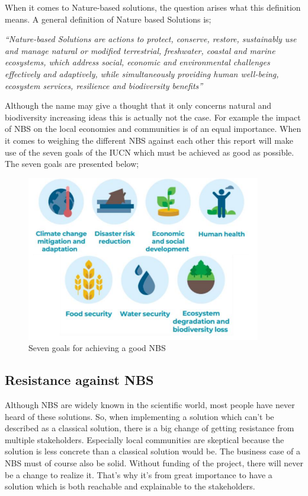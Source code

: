 When it comes to Nature-based solutions, the question arises what this definition means. A general definition of Nature based Solutions is;

\textit{“Nature-based Solutions are actions to protect, conserve, restore, sustainably
use and manage natural or modified terrestrial, freshwater, coastal and marine
ecosystems, which address social, economic and environmental challenges
effectively and adaptively, while simultaneously providing human well-being,
ecosystem services, resilience and biodiversity benefits” \autocite{eiselinVerenigdeNatiesStemmen2022}}

Although the name may give a thought that it only concerns natural and biodiversity increasing ideas this is actually not the case. For example the impact of NBS on the local economies and communities is of an equal importance. When it comes to weighing the different NBS against each other this report will make use of the seven goals of the IUCN which must be achieved as good as possible. The seven goals are presented below;

\begin{figure}[H]
    \centering
    \includegraphics[width=0.50\linewidth]{figures/ThesevenNBSgoals.png}
    \caption{Seven goals for achieving a good NBS \autocite{.....}}
    \label{fig:7g}
\end{figure}

\subsection{Resistance against NBS}

Although NBS are widely known in the scientific world, most people have never heard of these solutions. So, when implementing a solution which can't be described as a classical solution, there is a big change of getting resistance from multiple stakeholders. Especially local communities are skeptical because the solution is less concrete than a classical solution would be. The business case of a NBS must of course also be solid. Without funding of the project, there will never be a change to realize it. That's why it's from great importance to have a solution which is both reachable and explainable to the stakeholders. 


